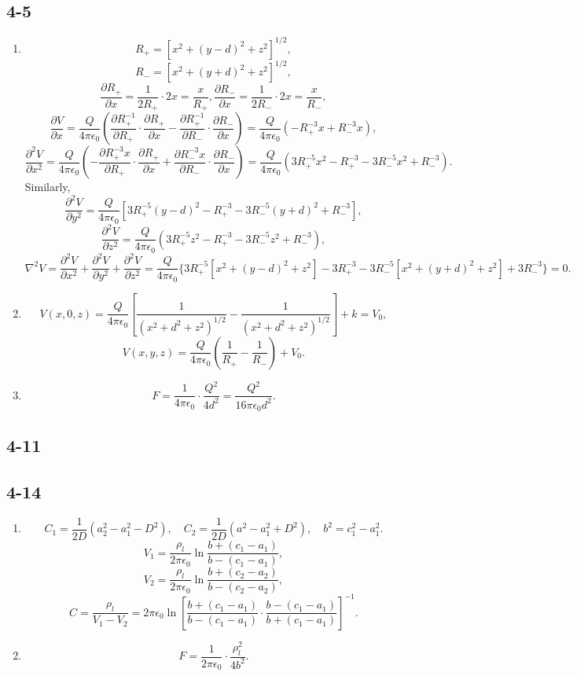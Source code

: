 \documentclass[11pt,a4paper]{article}
\begin{document}
\subsection{4-5}
\begin{enumerate}[label=\alph*)]
\item
$$R_+=[x^2+(y-d)^2+z^2]^{1/2},$$
$$R_-=[x^2+(y+d)^2+z^2]^{1/2},$$
$$\frac{\partial R_+}{\partial x}=\frac{1}{2R_+}\cdot2x=\frac{x}{R_+},\frac{\partial R_-}{\partial x}=\frac{1}{2R_-}\cdot2x=\frac{x}{R_-},$$
$$\frac{\partial V}{\partial x}=\frac{Q}{4\pi\epsilon_0}\left(\frac{\partial R_+^{-1}}{\partial R_+}\cdot\frac{\partial R_+}{\partial x}-\frac{\partial R_+^{-1}}{\partial R_-}\cdot\frac{\partial R_-}{\partial x}\right)=\frac{Q}{4\pi\epsilon_0}(-R_+^{-3}x+R_-^{-3}x),$$
$$\frac{\partial^2 V}{\partial x^2}=\frac{Q}{4\pi\epsilon_0}\left(-\frac{\partial R_+^{-3}x}{\partial R_+}\cdot\frac{\partial R_+}{\partial x}+\frac{\partial R_-^{-3}x}{\partial R_-}\cdot\frac{\partial R_-}{\partial x}\right)=\frac{Q}{4\pi\epsilon_0}(3R_+^{-5}x^2-R_+^{-3}-3R_-^{-5}x^2+R_-^{-3}).$$
Similarly,
$$\frac{\partial^2 V}{\partial y^2}=\frac{Q}{4\pi\epsilon_0}[3R_+^{-5}(y-d)^2-R_+^{-3}-3R_-^{-5}(y+d)^2+R_-^{-3}],$$
$$\frac{\partial^2 V}{\partial z^2}=\frac{Q}{4\pi\epsilon_0}(3R_+^{-5}z^2-R_+^{-3}-3R_-^{-5}z^2+R_-^{-3}),$$
$$\nabla^2 V=\frac{\partial^2 V}{\partial x^2}+\frac{\partial^2 V}{\partial y^2}+\frac{\partial^2 V}{\partial z^2}=\frac{Q}{4\pi\epsilon_0}\{3R_+^{-5}[x^2+(y-d)^2+z^2]-3R_+^{-3}-3R_-^{-5}[x^2+(y+d)^2+z^2]+3R_-^{-3}\}=0.$$
\item
$$V(x,0,z)=\frac{Q}{4\pi\epsilon_0}\left[\frac{1}{(x^2+d^2+z^2)^{1/2}}-\frac{1}{(x^2+d^2+z^2)^{1/2}}\right]+k=V_0,$$
$$V(x,y,z)=\frac{Q}{4\pi\epsilon_0}\left(\frac{1}{R_+}-\frac{1}{R_-}\right)+V_0.$$
\item
$$F=\frac{1}{4\pi\epsilon_0}\cdot\frac{Q^2}{4d^2}=\frac{Q^2}{16\pi\epsilon_0d^2}.$$
\end{enumerate}

\subsection{4-11}

\subsection{4-14}
\begin{enumerate}[label=\alph*)]
\item
$$C_1=\frac{1}{2D}(a_2^2-a_1^2-D^2),\quad C_2=\frac{1}{2D}(a^2-a_1^2+D^2),\quad b^2=c_1^2-a_1^2.$$
$$V_1=\frac{\rho_l}{2\pi\epsilon_0}\ln\frac{b+(c_1-a_1)}{b-(c_1-a_1)},$$
$$V_2=\frac{\rho_l}{2\pi\epsilon_0}\ln\frac{b+(c_2-a_2)}{b-(c_2-a_2)},$$
$$C=\frac{\rho_l}{V_1-V_2}=2\pi\epsilon_0\ln\left[\frac{b+(c_1-a_1)}{b-(c_1-a_1)}\cdot\frac{b-(c_1-a_1)}{b+(c_1-a_1)}\right]^{-1}.$$
\item
$$F=\frac{1}{2\pi\epsilon_0}\cdot\frac{\rho_l^2}{4b^2}.$$
\end{enumerate}
\end{document}
